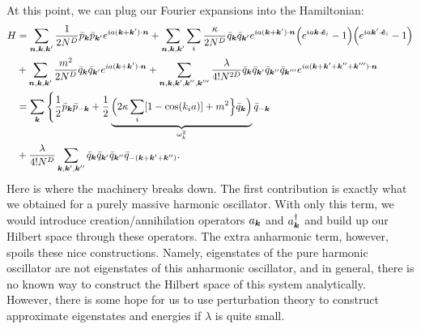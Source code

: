 {At this point, we can plug our Fourier expansions into the Hamiltonian:
\begin{align}
    H &= \sum_{\vb*{n},\vb*{k},\vb*{k}'} \frac{1}{2 N^{D}} \bar{p}_{\vb*{k}} \bar{p}_{\vb*{k}'} e^{ia(\vb*{k} + \vb*{k}') \cdot \vb*{n}} + \sum_{\vb*{n},\vb*{k},\vb*{k}'} \sum_{i} \frac{\kappa}{2 N^{D}} \bar{q}_{\vb*{k}} \bar{q}_{\vb*{k}'} e^{ia(\vb*{k} + \vb*{k}') \cdot \vb*{n}} \Big( e^{i a \vb*{k} \cdot \vu*{e}_{i}} - 1 \Big) \Big( e^{i a \vb*{k}' \cdot \vu*{e}_{i}} - 1 \Big) \nonumber \\
    &+ \sum_{\vb*{n},\vb*{k},\vb*{k}'} \frac{m^2}{2 N^{D}} \bar{q}_{\vb*{k}} \bar{q}_{\vb*{k}'} e^{ia(\vb*{k} + \vb*{k}') \cdot \vb*{n}} + \sum_{\vb*{n},\vb*{k},\vb*{k}',\vb*{k}'',\vb*{k}'''} \frac{\lambda}{4! N^{2D}} \bar{q}_{\vb*{k}} \bar{q}_{\vb*{k}'} \bar{q}_{\vb*{k}''} \bar{q}_{\vb*{k}'''} e^{ia(\vb*{k} + \vb*{k}' + \vb*{k}'' + \vb*{k}''') \cdot \vb*{n}} \nonumber \\
    &= \sum_{\vb*{k}} \Bigg\{ \frac{1}{2} \bar{p}_{\vb*{k}} \bar{p}_{-\vb*{k}} + \frac{1}{2} \underbrace{\Big( 2 \kappa \sum_{i} [1 - \cos(k_{i} a)] + m^2 \Big\} \bar{q}_{\vb*{k}} \Big)}_{\omega_{k}^2} \bar{q}_{-\vb*{k}} \nonumber \\
    &+ \frac{\lambda}{4! N^{D}} \sum_{\vb*{k},\vb*{k}',\vb*{k}''} \bar{q}_{\vb*{k}} \bar{q}_{\vb*{k}'} \bar{q}_{\vb*{k}''} \bar{q}_{-(\vb*{k} + \vb*{k}' + \vb*{k}'')}
.\end{align}
Here is where the machinery breaks down.
The first contribution is exactly what we obtained for a purely massive harmonic oscillator.
With only this term, we would introduce creation/annihilation operators $a_{\vb*{k}}$ and $a_{\vb*{k}}^{\dagger}$ and build up our Hilbert space through these operators.
The extra anharmonic term, however, spoils these nice constructions.
Namely, eigenstates of the pure harmonic oscillator are not eigenstates of this anharmonic oscillator, and in general, there is no known way to construct the Hilbert space of this system analytically.
However, there is some hope for us to use perturbation theory to construct approximate eigenstates and energies if $\lambda$ is quite small.




}


    

